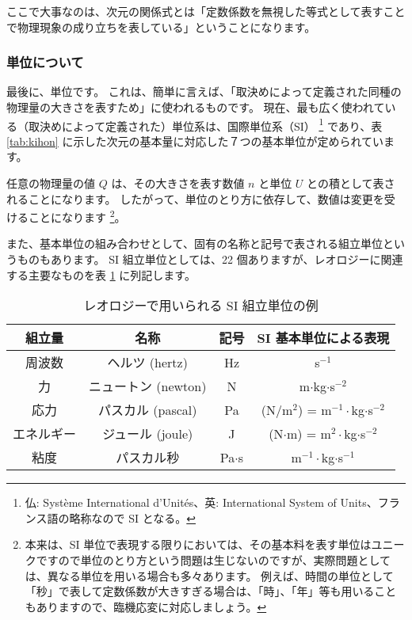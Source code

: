 \documentclass[uplatex,dvipdfmx,a4paper,11pt]{jsreport}
\begin{document}
ここで大事なのは、次元の関係式とは「定数係数を無視した等式として表すことで物理現象の成り立ちを表している」ということになります。

\subsubsection{単位について}
最後に、単位です。
これは、簡単に言えば、「取決めによって定義された同種の物理量の大きさを表すため」に使われるものです。
現在、最も広く使われている（取決めによって定義された）単位系は、国際単位系（SI）
\footnote{仏: Syst\`eme International d'Unit\'es、英: International System of Units、フランス語の略称なので SI となる。}
であり、表 \ref{tab:kihon} に示した次元の基本量に対応した７つの基本単位が定められています。

任意の物理量の値 $Q$ は、その大きさを表す数値 $n$ と単位 $U$ との積として表されることになります。
したがって、単位のとり方に依存して、数値は変更を受けることになります
\footnote{
	本来は、SI 単位で表現する限りにおいては、その基本料を表す単位はユニークですので単位のとり方という問題は生じないのですが、実際問題としては、異なる単位を用いる場合も多々あります。
	例えば、時間の単位として「秒」で表して定数係数が大きすぎる場合は、「時」、「年」等も用いることもありますので、臨機応変に対応しましょう。
}。

また、基本単位の組み合わせとして、固有の名称と記号で表される組立単位というものもあります。
SI 組立単位としては、22 個ありますが、レオロジーに関連する主要なものを表 \ref{tab:kumitate} に列記します。
\begin{table}[htb]
	\begin{center}
		\caption{レオロジーで用いられる SI 組立単位の例}
		\label{tab:kumitate}
		\begin{tabular}{|c|c||c|c|} \hline
			組立量 		& 名称					& 記号		& SI 基本単位による表現 	\\ \hline \hline
			周波数		& ヘルツ (hertz)		& Hz		&  s$^{-1}$ 					\\ \hline
			力\index{ちから@力}			& ニュートン (newton)	& N 		& m$\cdot$kg$\cdot$s$^{-2}$ 	\\ \hline
			応力\index{おうりょく@応力}		& パスカル (pascal)		& Pa 		& (N/m$^2$) = m$^{-1}\cdot$kg$\cdot$s$^{-2}$ \\ \hline
			エネルギー	& ジュール (joule)		& J 		& (N$\cdot$m) = m$^{2}\cdot$kg$\cdot$s$^{-2}$ \\ \hline
			粘度		& パスカル秒			& Pa$\cdot$s & m$^{-1}\cdot$kg$\cdot$s$^{-1}$ \\ \hline
		\end{tabular}
	\end{center}
\end{table}
\end{document}
